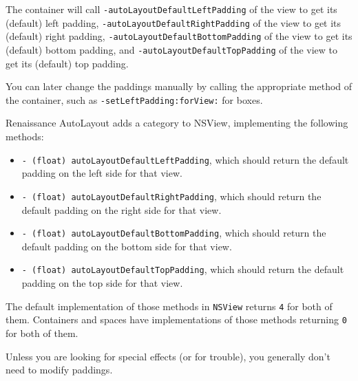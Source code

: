 The container will call \texttt{-autoLayoutDefaultLeftPadding} of the
view to get its (default) left padding,
\texttt{-autoLayoutDefaultRightPadding} of the view to get its
(default) right padding, \texttt{-autoLayoutDefaultBottomPadding} of
the view to get its (default) bottom padding, and
\texttt{-autoLayoutDefaultTopPadding} of the view to get its (default)
top padding.

You can later change the paddings manually by calling the appropriate
method of the container, such as \texttt{-setLeftPadding:forView:} for
boxes.

Renaissance AutoLayout adds a category to NSView, implementing the
following methods:

\begin{itemize}
\item \texttt{- (float) autoLayoutDefaultLeftPadding}, which should
return the default padding on the left side for that view.
\item \texttt{- (float) autoLayoutDefaultRightPadding}, which should
return the default padding on the right side for that view.
\item \texttt{- (float) autoLayoutDefaultBottomPadding}, which should
return the default padding on the bottom side for that view.
\item \texttt{- (float) autoLayoutDefaultTopPadding}, which should
return the default padding on the top side for that view.
\end{itemize}

The default implementation of those methods in \texttt{NSView} returns
\texttt{4} for both of them.  Containers and spaces have implementations
of those methods returning \texttt{0} for both of them.

Unless you are looking for special effects (or for trouble), you
generally don't need to modify paddings.

